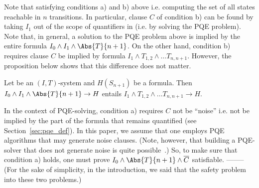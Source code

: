 Note that satisfying conditions a) and b) above  i.e. computing the set of all states reachable
in $n$ transitions. In particular, clause $C$ of condition b) can be
found by taking $I_1$ out of the scope of quantifiers in
 (i.e. by solving
the PQE problem). Note that, in general, a solution to the PQE problem
above is implied by the entire formula $I_0 \wedge I_1 \wedge
\Abs{T}{n+1}$. On the other hand, condition b) requires clause $C$ be
implied by formula $I_1 \wedge T_{1,2} \wedge \dots
T_{n,n+1}$. However, the proposition below shows that this difference
does not matter.
\begin{proposition}
\label{prop:dfs}
Let \KS be an $(I,T)$-system and $H(S_{n+1})$ be a formula. Then $I_0
\wedge I_1 \wedge \Abs{T}{n+1} \rightarrow H$ entails $I_1 \wedge
T_{1,2} \wedge \dots T_{n,n+1} \rightarrow H$.
\end{proposition}


In the context of PQE-solving, condition a) requires $C$ not be
``noise'' i.e. not be implied by the part of the formula that remains
quantified (see Section~\ref{sec:pqe_def}). In this paper, we assume
that one employs PQE algorithms that may generate noise
clauses. (Note, however, that building a PQE-solver that does not
generate noise is quite possible~\cite{clean_pqe}.)  So, to make sure
that condition a) holds, one must prove $I_0 \wedge \Abs{T}{n+1}
\wedge \overline{C}$ satisfiable.
--------
(For the sake of simplicity, in the
introduction, we said that \PP {} the safety problem into
these two problems.)  
